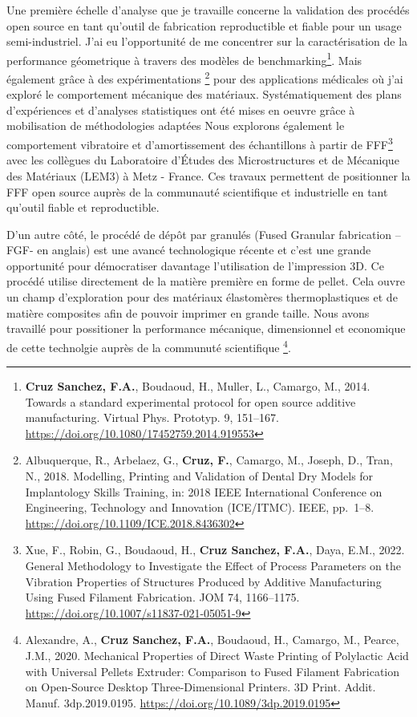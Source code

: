 \documentclass[
  12pt,
  oneside]{book}
\begin{document}
Une première échelle d'analyse que je travaille concerne la validation des procédés open source en tant qu'outil de fabrication reproductible et fiable pour un usage semi-industriel.
J'ai eu l'opportunité de me concentrer sur la caractérisation de la performance géometrique à travers des modèles de benchmarking\footnote{\textbf{Cruz Sanchez, F.A.}, Boudaoud, H., Muller, L., Camargo, M., 2014. Towards a standard experimental protocol for open source additive manufacturing. Virtual Phys. Prototyp. 9, 151--167. \url{https://doi.org/10.1080/17452759.2014.919553}}.
Mais également grâce à des expérimentations \footnote{Albuquerque, R., Arbelaez, G., \textbf{Cruz, F.}, Camargo, M., Joseph, D., Tran, N., 2018. Modelling, Printing and Validation of Dental Dry Models for Implantology Skills Training, in: 2018 IEEE International Conference on Engineering, Technology and Innovation (ICE/ITMC). IEEE, pp.~1--8. \url{https://doi.org/10.1109/ICE.2018.8436302}} pour des applications médicales où j'ai exploré le comportement mécanique des matériaux.
Systématiquement des plans d'expériences et d'analyses statistiques ont été mises en oeuvre grâce à mobilisation de méthodologies adaptées
Nous explorons également le comportement vibratoire et d'amortissement des échantillons à partir de FFF\footnote{Xue, F., Robin, G., Boudaoud, H., \textbf{Cruz Sanchez, F.A.}, Daya, E.M., 2022. General Methodology to Investigate the Effect of Process Parameters on the Vibration Properties of Structures Produced by Additive Manufacturing Using Fused Filament Fabrication. JOM 74, 1166--1175. \url{https://doi.org/10.1007/s11837-021-05051-9}} avec les collègues du Laboratoire d'Études des Microstructures et de Mécanique des Matériaux (LEM3) à Metz - France.
Ces travaux permettent de positionner la FFF open source auprès de la communauté scientifique et industrielle en tant qu'outil fiable et reproductible.

D'un autre côté, le procédé de dépôt par granulés (Fused Granular fabrication --FGF- en anglais) est une avancé technologique récente et c'est une grande opportunité pour démocratiser davantage l'utilisation de l'impression 3D.
Ce procédé utilise directement de la matière première en forme de pellet.
Cela ouvre un champ d'exploration pour des matériaux élastomères thermoplastiques et de matière composites afin de pouvoir imprimer en grande taille.
Nous avons travaillé pour possitioner la performance mécanique, dimensionnel et economique de cette technolgie auprès de la communuté scientifique \footnote{Alexandre, A., \textbf{Cruz Sanchez, F.A.}, Boudaoud, H., Camargo, M., Pearce, J.M., 2020. Mechanical Properties of Direct Waste Printing of Polylactic Acid with Universal Pellets Extruder: Comparison to Fused Filament Fabrication on Open-Source Desktop Three-Dimensional Printers. 3D Print. Addit. Manuf. 3dp.2019.0195. \url{https://doi.org/10.1089/3dp.2019.0195}}.
\end{document}
